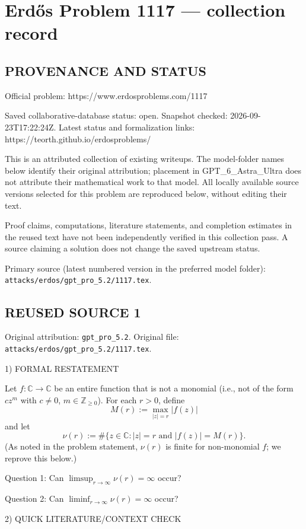 \section*{Erd\H{o}s Problem 1117 --- collection record}

\subsection*{PROVENANCE AND STATUS}
Official problem: https://www.erdosproblems.com/1117

Saved collaborative-database status: open.
Snapshot checked: 2026-09-23T17:22:24Z.
Latest status and formalization links: https://teorth.github.io/erdosproblems/

This is an attributed collection of existing writeups. The model-folder names below identify their original attribution; placement in GPT\_6\_Astra\_Ultra does not attribute their mathematical work to that model. All locally available source versions selected for this problem are reproduced below, without editing their text.

Proof claims, computations, literature statements, and completion estimates in the reused text have not been independently verified in this collection pass. A source claiming a solution does not change the saved upstream status.

Primary source (latest numbered version in the preferred model folder): \texttt{attacks/erdos/gpt\_pro\_5.2/1117.tex}.

\subsection*{REUSED SOURCE 1}
Original attribution: \texttt{gpt\_pro\_5.2}.
Original file: \texttt{attacks/erdos/gpt\_pro\_5.2/1117.tex}.


1) FORMAL RESTATEMENT

Let \(f:\mathbb{C}\to\mathbb{C}\) be an entire function that is not a monomial (i.e., not of the form \(c z^m\) with \(c\ne 0\), \(m\in\mathbb{Z}_{\ge 0}\)). For each \(r>0\), define
\[
M(r):=\max_{|z|=r} |f(z)|
\]
and let
\[
\nu(r):=\#\{z\in\mathbb{C}: |z|=r\text{ and }|f(z)|=M(r)\}.
\]
(As noted in the problem statement, \(\nu(r)\) is finite for non-monomial \(f\); we reprove this below.)

Question 1: Can \(\limsup_{r\to\infty} \nu(r)=\infty\) occur?

Question 2: Can \(\liminf_{r\to\infty} \nu(r)=\infty\) occur?

2) QUICK LITERATURE/CONTEXT CHECK

